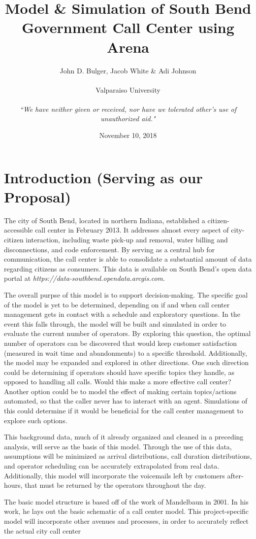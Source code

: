 \documentclass[11pt,twocolumn]{article}
\title{Model \& Simulation of South Bend Government Call Center using Arena}
\author{John D. Bulger, Jacob White \& Adi Johnson
\\
\\
Valparaiso University
\\
\\
\textit{``We have neither given or received, nor have we tolerated other’s use of unauthorized aid."}\\
}
\date{November 10, 2018}
\begin{document}
\maketitle

\section{Introduction (Serving as our Proposal)}
The city of South Bend, located in northern Indiana, established a citizen-accessible call center in February 2013.  It addresses almost every aspect of city-citizen interaction, including waste pick-up and removal, water billing and disconnections, and code enforcement.  By serving as a central hub for communication, the call center is able to consolidate a substantial amount of data regarding citizens as consumers.  This data is available on South Bend's open data portal at \textit{https://data-southbend.opendata.arcgis.com}.
\par
The overall purpse of this model is to support decision-making.  The specific goal of the model is yet to be determined, depending on if and when call center management gets in contact with a schedule and exploratory questions.  In the event this falls through, the model will be built and simulated in order to evaluate the current number of operators.  By exploring this question, the optimal number of operators can be discovered that would keep customer satisfaction (measured in wait time and abandonments) to a specific threshold.  Additionally, the model may be expanded and explored in other directions. One such direction could be determining if operators should have specific topics they handle, as opposed to handling all calls.  Would this make a more effective call center?  Another option could be to model the effect of making certain topics/actions automated, so that the caller never has to interact with an agent.  Simulations of this could determine if it would be beneficial for the call center management to explore such options.
\par
This background data, much of it already organized and cleaned in a preceding analysis, will serve as the basis of this model.  Through the use of this data, assumptions will be minimized as arrival distributions, call duration distributions, and operator scheduling can be accurately extrapolated from real data.  Additionally, this model will incorporate the voicemails left by customers after-hours, that must be returned by the operators throughout the day.
\par
The basic model structure is based off of the work of Mandelbaun in 2001.  In his work, he lays out the basic schematic of a call center model.\cite{mandelbaun}  This project-specific model will incorporate other avenues and processes, in order to accurately reflect the actual city call center
\end{document}
